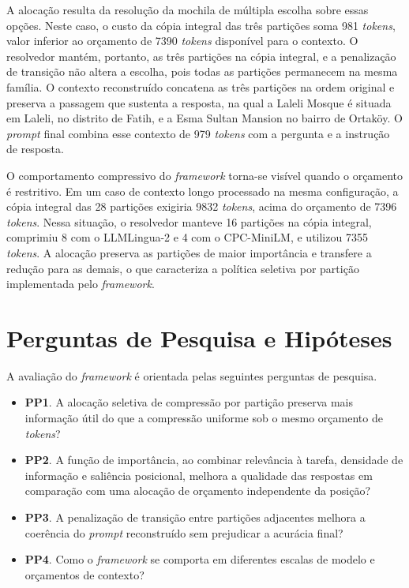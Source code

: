 A alocação resulta da resolução da mochila de múltipla escolha sobre essas opções. Neste caso, o custo da cópia integral das três partições soma 981 \textit{tokens}, valor inferior ao orçamento de 7390 \textit{tokens} disponível para o contexto. O resolvedor mantém, portanto, as três partições na cópia integral, e a penalização de transição não altera a escolha, pois todas as partições permanecem na mesma família. O contexto reconstruído concatena as três partições na ordem original e preserva a passagem que sustenta a resposta, na qual a Laleli Mosque é situada em Laleli, no distrito de Fatih, e a Esma Sultan Mansion no bairro de Ortaköy. O \textit{prompt} final combina esse contexto de 979 \textit{tokens} com a pergunta e a instrução de resposta.

O comportamento compressivo do \textit{framework} torna-se visível quando o orçamento é restritivo. Em um caso de contexto longo processado na mesma configuração, a cópia integral das 28 partições exigiria 9832 \textit{tokens}, acima do orçamento de 7396 \textit{tokens}. Nessa situação, o resolvedor manteve 16 partições na cópia integral, comprimiu 8 com o LLMLingua-2 e 4 com o CPC-MiniLM, e utilizou 7355 \textit{tokens}. A alocação preserva as partições de maior importância e transfere a redução para as demais, o que caracteriza a política seletiva por partição implementada pelo \textit{framework}.

\section{Perguntas de Pesquisa e Hipóteses}
\label{sec:perguntas-hipoteses}

A avaliação do \textit{framework} é orientada pelas seguintes perguntas de pesquisa.

\begin{itemize}[leftmargin=1.6em]
\item \textbf{PP1}. A alocação seletiva de compressão por partição preserva mais informação útil do que a compressão uniforme sob o mesmo orçamento de \textit{tokens}?

\item \textbf{PP2}. A função de importância, ao combinar relevância à tarefa, densidade de informação e saliência posicional, melhora a qualidade das respostas em comparação com uma alocação de orçamento independente da posição?

\item \textbf{PP3}. A penalização de transição entre partições adjacentes melhora a coerência do \textit{prompt} reconstruído sem prejudicar a acurácia final?

\item \textbf{PP4}. Como o \textit{framework} se comporta em diferentes escalas de modelo e orçamentos de contexto?
\end{itemize}

